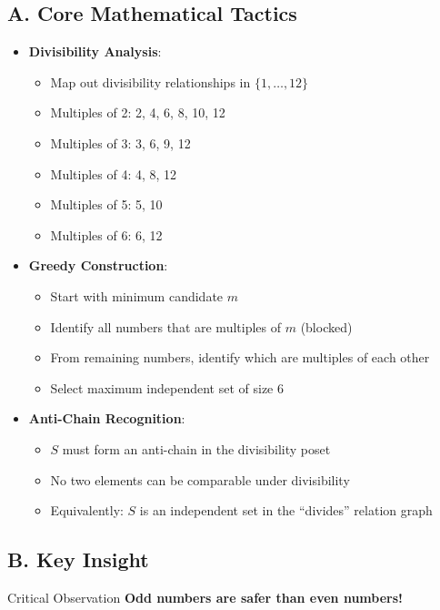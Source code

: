 \documentclass[12pt]{article}
\begin{document}
\begin{tacticalbox}
\subsection*{A. Core Mathematical Tactics}
\begin{itemize}[leftmargin=*]
    \item \textbf{Divisibility Analysis}: 
    \begin{itemize}
        \item Map out divisibility relationships in $\{1,\ldots,12\}$
        \item Multiples of 2: 2, 4, 6, 8, 10, 12
        \item Multiples of 3: 3, 6, 9, 12
        \item Multiples of 4: 4, 8, 12
        \item Multiples of 5: 5, 10
        \item Multiples of 6: 6, 12
    \end{itemize}
    
    \item \textbf{Greedy Construction}:
    \begin{itemize}
        \item Start with minimum candidate $m$
        \item Identify all numbers that are multiples of $m$ (blocked)
        \item From remaining numbers, identify which are multiples of each other
        \item Select maximum independent set of size 6
    \end{itemize}
    
    \item \textbf{Anti-Chain Recognition}:
    \begin{itemize}
        \item $S$ must form an anti-chain in the divisibility poset
        \item No two elements can be comparable under divisibility
        \item Equivalently: $S$ is an independent set in the ``divides'' relation graph
    \end{itemize}
\end{itemize}

\subsection*{B. Key Insight}
\begin{highlightbox}{Critical Observation}
\textbf{Odd numbers are safer than even numbers!}


\end{highlightbox}
\end{tacticalbox}
\end{document}
